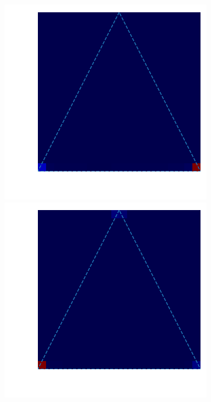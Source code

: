 \begin{figure}
 \begin{minipage}[]{.3\textwidth}
    \includegraphics[width=\textwidth]{triangle_0_2kld.png}
\subcaption{}
\end{minipage}
 \begin{minipage}{.3\textwidth}
    \includegraphics[width=\textwidth]{triangle_0_2elbo.png}

\end{minipage}
\end{figure}
